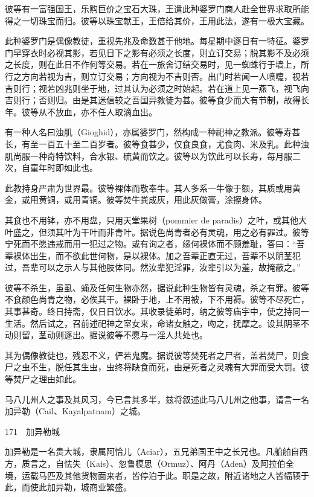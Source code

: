 \documentclass[12pt,UTF8]{ctexbook}
\begin{document}
彼等有一富强国王，乐购巨价之宝石大珠，王遣此种婆罗门商人赴全世界求取所能得之一切珠宝而归。彼等以珠宝献王，王倍给其价，王用此法，遂有一极大宝藏。

此种婆罗门是偶像教徒，重视先兆及命数甚于他地。每星期中逐日有一特征。婆罗门早穿衣时必视其影，若见日下之影有必须之长度，则立订交易；脱其影不及必须之长度，则在此日不作何等交易。若在一旅舍订结交易时，见一蜘蛛行于墙上，所行之方向若视为吉，则立订交易；方向视为不吉则否。出门时若闻一人喷嚏，视若吉则行；视若凶兆则坐于地，过其认为必须之时始起。若在道上见一燕飞，视飞向吉则行；否则归。由是其迷信较之吾国异教徒为甚。彼等食少而大有节制，故得长年。彼等从不放血，亦不任人取滴血出。

有一种人名曰浊肌（Gioghid），亦属婆罗门，然构成一种祀神之教派。彼等寿甚长，有至一百五十至二百岁者。彼等食甚少，仅食良食，尤食肉、米及乳。此种浊肌尚服一种奇特饮料，合水银、硫黄而饮之。彼等以为饮此可以长寿，每月服二次，自童年时即如此也。

此教持身严肃为世界最。彼等裸体而敬奉牛。其人多系一牛像于额，其质或用黄金，或用黄铜，或用青铜。彼等焚牛粪成灰，用此灰做膏，涂擦身体。

其食也不用钵，亦不用盘，只用天堂果树（pommier de paradis）之叶，或其他大叶盛之，但须其叶为干叶而非青叶。据说色尚青者必有灵魂，用之必有罪过。彼等宁死而不愿违戒而用一犯过之物。或有询之者，缘何裸体而不顾羞耻，答曰：“吾辈裸体出生，而不欲此世何物，是以裸体。加之吾辈正直无过，吾辈不以阴茎犯过，吾辈可以之示人与其他肢体同。然汝辈犯淫罪，汝辈引以为羞，故掩蔽之。”

彼等不杀生，虽虱、蝇及任何生物亦然，据说此种生物皆有灵魂，杀之有罪。彼等不食颜色尚青之物，必俟其干。裸卧于地，上不用被，下不用褥。彼等不尽死亡，其事甚奇。终日持斋，仅日日饮水。其收录徒弟时，纳之彼等庙宇中，使之持同一生活。然后试之，召前述祀神之室女来，命诸女触之，吻之，抚摩之。设其阴茎不动则留，茎动则逐出。据说彼等不愿与一淫人共处也。

其为偶像教徒也，残忍不义，俨若鬼魔。据说彼等焚死者之尸者，盖若焚尸，则食尸之虫不生，脱任其生虫，虫终将缺食而死，由是死者之灵魂有大罪而受大罚。彼等焚尸之理由如此。

马八儿州人之事及其风习，今已言其多半，兹将叙述此马八儿州之他事，请言一名加异勒（Cail、Kayalpatnam）之城。





171　加异勒城

加异勒是一名贵大城，隶属阿恰儿（Aciar），五兄弟国王中之长兄也。凡船舶自西方，质言之，自怯失（Kais）、忽鲁模思（Ormuz）、阿丹（Aden）及阿拉伯全境，运载马匹及其他货物面来者，皆停泊于此。职是之故，附近诸地之人皆辐辏于此，而使此加异勒，城商业繁盛。
\end{document}
